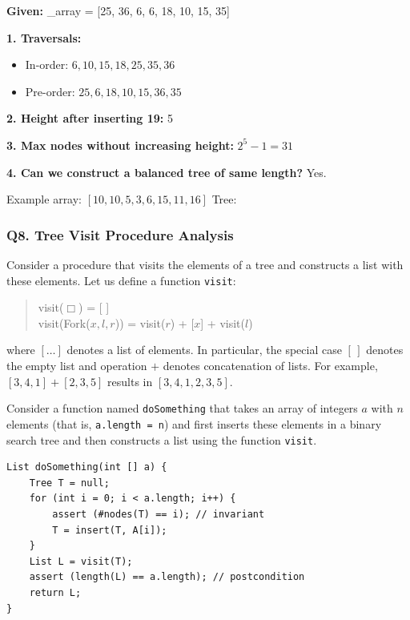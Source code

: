\textbf{Given:} \_array = [25, 36, 6, 6, 18, 10, 15, 35]

\textbf{1. Traversals:}
\begin{itemize}
  \item In-order: $6, 10, 15, 18, 25, 35, 36$
  \item Pre-order: $25, 6, 18, 10, 15, 36, 35$
\end{itemize}

\textbf{2. Height after inserting 19:} 5

\textbf{3. Max nodes without increasing height:} $2^5 - 1 = 31$

\textbf{4. Can we construct a balanced tree of same length?} Yes.

Example array: $[10,10,5,3,6,15,11,16]$
Tree:

\subsubsection{Q8. Tree Visit Procedure Analysis}
Consider a procedure that visits the elements of a tree and constructs a list with these elements. Let us define a function \texttt{visit}:

\begin{quote}
\begin{tt}
visit($\Box$) = [ ] \\
visit(Fork($x, l, r$)) = visit($r$) + [$x$] + visit($l$)
\end{tt}
\end{quote}

where $[\ldots]$ denotes a list of elements. In particular, the special case $[\,]$ denotes the empty list and operation $+$ denotes concatenation of lists. For example, $[3, 4, 1] + [2, 3, 5]$ results in $[3, 4, 1, 2, 3, 5]$.

Consider a function named \texttt{doSomething} that takes an array of integers $a$ with $n$ elements (that is, \texttt{a.length = n}) and first inserts these elements in a binary search tree and then constructs a list using the function \texttt{visit}.

\begin{lstlisting}
List doSomething(int [] a) {
    Tree T = null;
    for (int i = 0; i < a.length; i++) {
        assert (#nodes(T) == i); // invariant
        T = insert(T, A[i]);
    }
    List L = visit(T);
    assert (length(L) == a.length); // postcondition
    return L;
}
\end{lstlisting}


